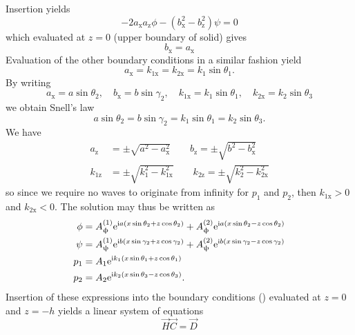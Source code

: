 Insertion yields
\begin{equation*}
	-2a_{\mathrm{x}} a_{\mathrm{z}} \phi - \left(b_{\mathrm{x}}^2-b_{\mathrm{z}}^2\right)\psi = 0
\end{equation*}
which evaluated at $z = 0$ (upper boundary of solid) gives
\begin{equation*}
	b_{\mathrm{x}} = a_{\mathrm{x}}
\end{equation*}
Evaluation of the other boundary conditions in a similar fashion yield
\begin{equation*}
	a_{\mathrm{x}} = k_{1\mathrm{x}} = k_{2\mathrm{x}} = k_1\sin\theta_1.
\end{equation*}
By writing
\begin{equation*}
	a_{\mathrm{x}} = a\sin\theta_2,\quad b_{\mathrm{x}} = b\sin\gamma_2,\quad k_{1\mathrm{x}} = k_1\sin\theta_1,\quad k_{2\mathrm{x}} = k_2\sin\theta_3
\end{equation*}
we obtain Snell's law
\begin{equation*}
	a\sin\theta_2 = b\sin\gamma_2 = k_1\sin\theta_1 = k_2\sin\theta_3.
\end{equation*}
We have
\begin{align*}
	a_{\mathrm{z}} &= \pm\sqrt{a^2-a_{\mathrm{x}}^2}\qquad
	b_{\mathrm{z}} = \pm\sqrt{b^2-b_{\mathrm{x}}^2}\\
	k_{1\mathrm{z}} &= \pm\sqrt{k_1^2-k_{1\mathrm{x}}^2}\qquad
	k_{2\mathrm{z}} = \pm\sqrt{k_2^2-k_{2\mathrm{x}}^2}
\end{align*}
so since we require no waves to originate from infinity for $p_1$ and $p_2$, then $k_{1\mathrm{x}}>0$ and $k_{2\mathrm{x}}<0$.
The solution may thus be written as 
\begin{align*}
	\phi &= A_{\upphi}^{(1)}\mathrm{e}^{\mathrm{i} a(x\sin\theta_2 + z\cos\theta_2)} + A_{\upphi}^{(2)}\mathrm{e}^{\mathrm{i} a(x\sin\theta_2 - z\cos\theta_2)}\\
	\psi &= A_{\uppsi}^{(1)}\mathrm{e}^{\mathrm{i} b(x\sin\gamma_2 + z\cos\gamma_2)} + A_{\uppsi}^{(2)}\mathrm{e}^{\mathrm{i} b(x\sin\gamma_2 - z\cos\gamma_2)}\\
	p_1 &= A_1\mathrm{e}^{\mathrm{i} k_1(x\sin\theta_1 + z\cos\theta_1)}\\
	p_2 &= A_2\mathrm{e}^{\mathrm{i} k_2(x\sin\theta_3 - z\cos\theta_3)}.
\end{align*}
Insertion of these expressions into the boundary conditions () evaluated at $z=0$ and $z=-h$ yields a linear system of equations
\begin{equation*}
	\vec{H} \vec{C} = \vec{D}
\end{equation*}
